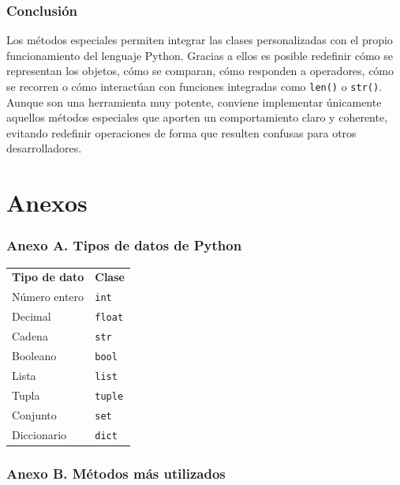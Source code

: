 \documentclass[11pt,a5paper,twoside]{book}
\begin{document}
\subsection{Conclusión}
Los métodos especiales permiten integrar las clases personalizadas con el propio funcionamiento del lenguaje Python. Gracias a ellos es posible redefinir cómo se representan los objetos, cómo se comparan, cómo responden a operadores, cómo se recorren o cómo interactúan con funciones integradas como {\scriptsize \texttt{len()}} o {\scriptsize \texttt{str()}}.
Aunque son una herramienta muy potente, conviene implementar únicamente aquellos métodos especiales que aporten un comportamiento claro y coherente, evitando redefinir operaciones de forma que resulten confusas para otros desarrolladores.

\newpage


\chapter{Anexos}

\subsection{Anexo A. Tipos de datos de Python}

\begin{tcolorbox}
\begin{tabular}{ll}
 \textbf{Tipo de dato}   &  \textbf{Clase}    \\
 Número entero  &  {\scriptsize \texttt{int}}    \\
 Decimal        &  {\scriptsize \texttt{float}}  \\
 Cadena         &  {\scriptsize \texttt{str}}    \\
 Booleano       &  {\scriptsize \texttt{bool}}   \\
 Lista          &  {\scriptsize \texttt{list}}   \\
 Tupla          &  {\scriptsize \texttt{tuple}}  \\
 Conjunto       &  {\scriptsize \texttt{set}}    \\
 Diccionario    &  {\scriptsize \texttt{dict}}   \\
\end{tabular}
\end{tcolorbox}

\newpage
\subsection{Anexo B. Métodos más utilizados}
\end{document}
